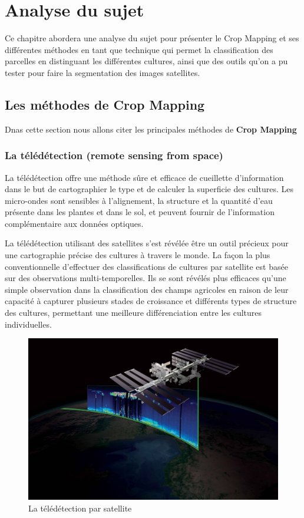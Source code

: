 \documentclass[12pt, openany]{report}
\begin{document}
\chapter{Analyse du sujet}


Ce chapitre abordera une analyse du sujet pour présenter le Crop Mapping et ses différentes méthodes en tant que technique qui permet la classification des parcelles en distinguant les différentes cultures, ainsi que des outils qu’on a pu tester pour faire la segmentation des images satellites. 

\newpage
\section{Les méthodes de Crop Mapping}

Dnas cette section nous allons citer les principales méthodes de \textbf{Crop Mapping}

\subsection{La télédétection (remote sensing from space)}

La télédétection offre une méthode sûre et efficace de cueillette d'information dans le but de cartographier le type et de calculer la superficie des cultures.
Les micro-ondes sont sensibles à l'alignement, la structure et la quantité d'eau présente dans les plantes et dans le sol, et peuvent fournir de l'information complémentaire aux données optiques. 

\par
La télédétection utilisant des satellites s'est révélée être un outil précieux pour une cartographie précise des cultures à travers le monde. La façon la plus conventionnelle d'effectuer des classifications de cultures par satellite est basée sur des observations multi-temporelles. Ils se sont révélés plus efficaces qu'une simple observation dans la classification des champs agricoles en raison de leur capacité à capturer plusieurs stades de croissance et différents types de structure des cultures, permettant une meilleure différenciation entre les cultures individuelles. \cite{cropmapp}

\begin{figure}[H]
\centering
\includegraphics[scale=0.15]{tele.jpg}
\caption{La télédétection par satellite}
\end{figure}
\end{document}
